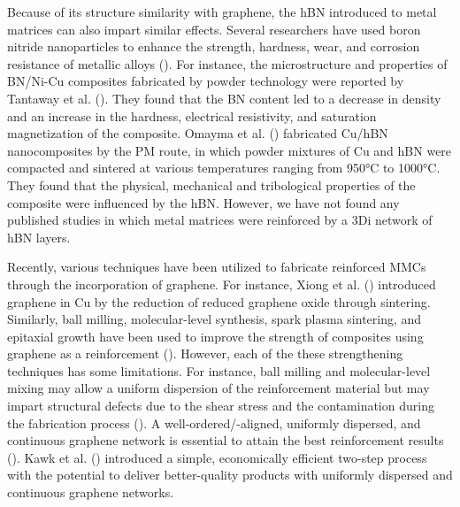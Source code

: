 Because of its structure similarity with graphene, the hBN introduced to metal matrices can also impart similar effects. Several researchers have used boron nitride nanoparticles to enhance the strength, hardness, wear, and corrosion resistance of metallic alloys (\cite{gopinath2020enhancing, reddy2013study, zitoun2008microstructure, khatavkar2018influence, cho2018effect}). For instance, the microstructure and properties of BN/Ni-Cu composites fabricated by powder technology were reported by Tantaway et al. (\cite{el2018microstructure}). They found that the BN content led to a decrease in density and an increase in the hardness, electrical resistivity, and saturation magnetization of the composite. Omayma et al. (\cite{elkady2015physico}) fabricated Cu/hBN nanocomposites by the PM route, in which powder mixtures of Cu and hBN were compacted and sintered at various temperatures ranging from 950°C to 1000°C. They found that the physical, mechanical and tribological properties of the composite were influenced by the hBN. However, we have not found any published studies in which metal matrices were reinforced by a 3Di network of hBN layers.

Recently, various techniques have been utilized to fabricate reinforced MMCs through the incorporation of graphene. For instance, Xiong et al. (\cite{LI2015400}) introduced graphene in Cu by the reduction of reduced graphene oxide through sintering. Similarly, ball milling, molecular-level synthesis, spark plasma sintering, and epitaxial growth have been used to improve the strength of composites using graphene as a reinforcement (\cite{chen2016fabrication, cao2017aligning, jiang2016copper, wang2019direct}). However, each of the these strengthening techniques has some limitations. For instance, ball milling and molecular-level mixing may allow a uniform dispersion of the reinforcement material but may impart structural defects due to the shear stress and the contamination during the fabrication process (\cite{naseer2019review}). A well-ordered/-aligned, uniformly dispersed, and continuous graphene network is essential to attain the best reinforcement results (\cite{chen2016fabrication}). Kawk et al. (\cite{kawk2019simple}) introduced a simple, economically efficient two-step process with the potential to deliver better-quality products with uniformly dispersed and continuous graphene networks.

